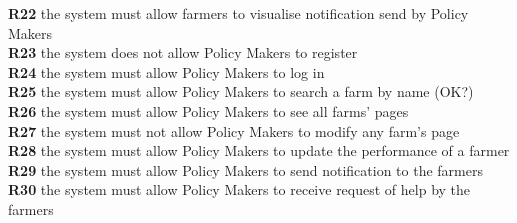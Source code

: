 \textbf{R22} the system must allow farmers to visualise notification send by Policy Makers\\
\textbf{R23} the system does not allow Policy Makers to register\\
\textbf{R24} the system must allow Policy Makers to log in\\
\textbf{R25} the system must allow Policy Makers to search a farm by name (OK?)\\
\textbf{R26} the system must allow Policy Makers to see all farms’ pages\\
\textbf{R27} the system must not allow Policy Makers to modify any farm’s page\\
\textbf{R28} the system must allow Policy Makers to update the performance of a farmer\\
\textbf{R29} the system must allow Policy Makers to send notification to the farmers\\
\textbf{R30} the system must allow Policy Makers to receive request of help by the farmers\\
